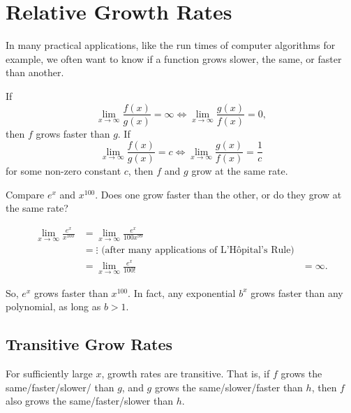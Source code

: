 \section{Relative Growth Rates}
In many practical applications, like the run times of computer algorithms for example, we often want to know if a function grows slower, the same, or faster than another.
\begin{definition}
	If
	\begin{equation*}
		\lim_{x \to \infty}{\frac{f(x)}{g(x)}} = \infty \Leftrightarrow \lim_{x \to \infty}{\frac{g(x)}{f(x)}} = 0,
	\end{equation*}
	then $f$  grows faster than $g$.
	If
	\begin{equation*}
		\lim_{x \to \infty}{\frac{f(x)}{g(x)}} = c \Leftrightarrow \lim_{x \to \infty}{\frac{g(x)}{f(x)}} = \frac{1}{c}
	\end{equation*}
	for some non-zero constant $c$, then $f$ and $g$ grow at the same rate.
\end{definition}

\begin{example}
	Compare $e^x$ and $x^{100}$.
	Does one grow faster than the other, or do they grow at the same rate?
\end{example}
\begin{answer}
	\begin{align*}
		\lim_{x\to\infty}{\frac{e^x}{x^{100}}} &= \lim_{x\to\infty}{\frac{e^x}{100x^{99}}} \\
		&= \vdots \text{ (after many applications of L'H\^{o}pital's Rule)} \\
		&= \lim_{x\to\infty}{\frac{e^x}{100!}}
		&= \infty.
	\end{align*}
	
	So, $e^x$ grows faster than $x^{100}$.
	In fact, any exponential $b^x$ grows faster than any polynomial, as long as $b > 1$.
\end{answer}

\subsection{Transitive Grow Rates}
For sufficiently large $x$, growth rates are transitive.
That is, if $f$ grows the same/faster/slower/ than $g$, and $g$ grows the same/slower/faster than $h$, then $f$ also grows the same/faster/slower than $h$.

